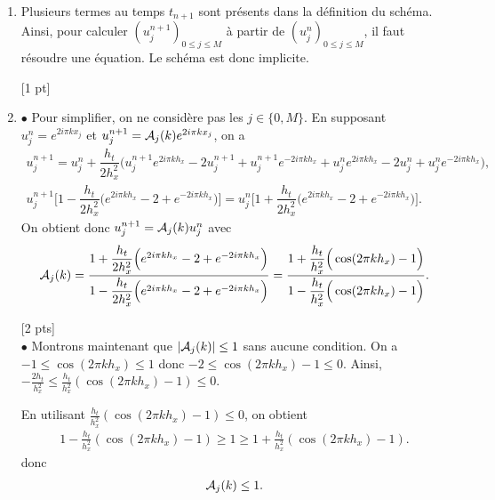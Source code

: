 \documentclass[12pt]{article}
\begin{document}
\begin{cor}
  $\quad$
  \\
  \begin{enumerate}
  \item Plusieurs termes au temps $t_{n+1}$ sont pr\'esents dans la d\'efinition du sch\'ema.
    Ainsi, pour calculer $(u_j^{n+1})_{0 \leq j \leq M}$ \`a partir de $(u_j^{n})_{0 \leq j \leq M}$,
    il faut r\'esoudre une \'equation. Le sch\'ema est donc implicite.

    [1 pt]
  \item
    $\bullet$ Pour simplifier, on ne consid\`ere pas les $j \in \{0,M\}$.
    En supposant $u^n_j = e^{2i \pi k x_j}$ et $u^{n+1}_j = \mathcal{A}_j(k) e^{2i \pi k x_j}$, on a
    \begin{align*}
      u_{j}^{n+1}
      = u_j^n + \dfrac{h_t}{2 h_x^2} \Big( u_{j}^{n+1} e^{2i \pi k h_x} - 2 u_{j}^{n+1} + u_{j}^{n+1} e^{-2i \pi k h_x} + u_{j}^{n} e^{2i \pi k h_x} - 2 u_{j}^n + u_{j}^{n} e^{-2i \pi k h_x} \Big) ,
      \\
      u_{j}^{n+1} \Big[ 1 - \dfrac{h_t}{2 h_x^2} \Big( e^{2i \pi k h_x} - 2 + e^{-2i \pi k h_x} \Big) \Big]
      = u_j^n \Big[ 1 + \dfrac{h_t}{2 h_x^2} \Big( e^{2i \pi k h_x} - 2 + e^{-2i \pi k h_x} \Big) \Big] .
    \end{align*}
    On obtient donc $u_j^{n+1} = \mathcal{A}_j(k) u_j^n$ avec
    \begin{align*}
      \mathcal{A}_j(k) = \dfrac{1 + \dfrac{h_t}{2 h_x^2} \Big( e^{2i \pi k h_x} - 2 + e^{-2i \pi k h_x} \Big)}{1 - \dfrac{h_t}{2 h_x^2} \Big( e^{2i \pi k h_x} - 2 + e^{-2i \pi k h_x} \Big)}
      = \dfrac{1 + \dfrac{h_t}{h_x^2} \Big( \cos(2 \pi k h_x) - 1 \Big)}{1 - \dfrac{h_t}{h_x^2} \Big( \cos(2 \pi k h_x) - 1 \Big)} .
    \end{align*}

    [2 pts]
    \\
    $\bullet$ Montrons maintenant que $|\mathcal{A}_j(k)| \leq 1$ sans aucune condition.
    On a $-1 \leq \cos(2\pi k h_x) \leq 1$ donc $-2 \leq \cos(2\pi k h_x) - 1 \leq 0$.
    Ainsi, $-\frac{2 h_t}{h_x^2} \leq \frac{h_t}{h_x^2} (\cos(2\pi k h_x) - 1) \leq 0$.

    En utilisant $\frac{h_t}{h_x^2} (\cos(2\pi k h_x) - 1) \leq 0$, on obtient
    \begin{align*}
      1 - \frac{h_t}{h_x^2} (\cos(2\pi k h_x) - 1) \geq 1 \geq 1 + \frac{h_t}{h_x^2} (\cos(2\pi k h_x) - 1) .
    \end{align*}
    donc
    \begin{align*}
      \mathcal{A}_j(k) \leq 1 .
    \end{align*}


\end{enumerate}
\end{cor}
\end{document}
